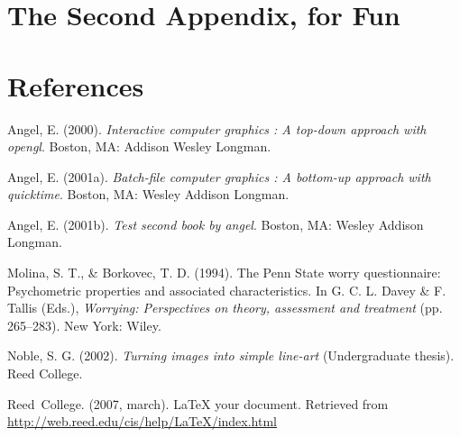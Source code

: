 \documentclass [11pt, proquest] {uwthesis}[2015/03/03]
\begin{document}
\chapter{The Second Appendix, for
Fun}\label{the-second-appendix-for-fun}

\backmatter

\chapter*{References}\label{references}


\noindent

\setlength{\parindent}{-0.20in} \setlength{\leftskip}{0.20in}
\setlength{\parskip}{8pt}

\hypertarget{refs}{}
\hypertarget{ref-angel2000}{}
Angel, E. (2000). \emph{Interactive computer graphics : A top-down
approach with opengl}. Boston, MA: Addison Wesley Longman.

\hypertarget{ref-angel2001}{}
Angel, E. (2001a). \emph{Batch-file computer graphics : A bottom-up
approach with quicktime}. Boston, MA: Wesley Addison Longman.

\hypertarget{ref-angel2002a}{}
Angel, E. (2001b). \emph{Test second book by angel}. Boston, MA: Wesley
Addison Longman.

\hypertarget{ref-Molina1994}{}
Molina, S. T., \& Borkovec, T. D. (1994). The Penn State worry
questionnaire: Psychometric properties and associated characteristics.
In G. C. L. Davey \& F. Tallis (Eds.), \emph{Worrying: Perspectives on
theory, assessment and treatment} (pp. 265--283). New York: Wiley.

\hypertarget{ref-noble2002}{}
Noble, S. G. (2002). \emph{Turning images into simple line-art}
(Undergraduate thesis). Reed College.

\hypertarget{ref-reedweb2007}{}
Reed~College. (2007, march). LaTeX your document. Retrieved from
\url{http://web.reed.edu/cis/help/LaTeX/index.html}
\end{document}
